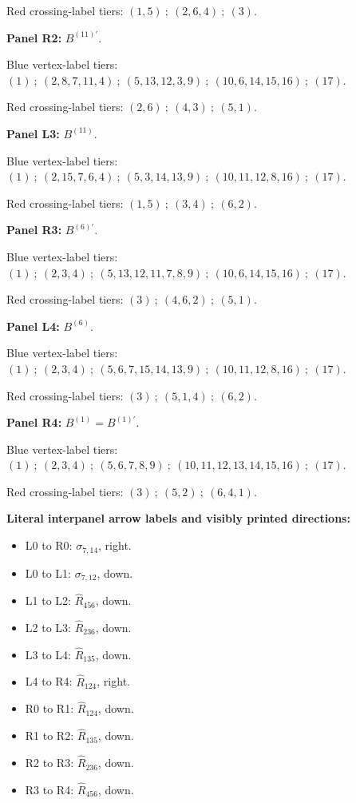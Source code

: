 \noindent Red crossing-label tiers: $(1,5)\ ;\ (2,6,4)\ ;\ (3)$.\par
\medskip\noindent\textbf{Panel R2:} $B^{(11)\prime}$.\par
\noindent Blue vertex-label tiers: $(1)\ ;\ (2,8,7,11,4)\ ;\ (5,13,12,3,9)\ ;\ (10,6,14,15,16)\ ;\ (17)$.\par
\noindent Red crossing-label tiers: $(2,6)\ ;\ (4,3)\ ;\ (5,1)$.\par
\medskip\noindent\textbf{Panel L3:} $B^{(11)}$.\par
\noindent Blue vertex-label tiers: $(1)\ ;\ (2,15,7,6,4)\ ;\ (5,3,14,13,9)\ ;\ (10,11,12,8,16)\ ;\ (17)$.\par
\noindent Red crossing-label tiers: $(1,5)\ ;\ (3,4)\ ;\ (6,2)$.\par
\medskip\noindent\textbf{Panel R3:} $B^{(6)\prime}$.\par
\noindent Blue vertex-label tiers: $(1)\ ;\ (2,3,4)\ ;\ (5,13,12,11,7,8,9)\ ;\ (10,6,14,15,16)\ ;\ (17)$.\par
\noindent Red crossing-label tiers: $(3)\ ;\ (4,6,2)\ ;\ (5,1)$.\par
\medskip\noindent\textbf{Panel L4:} $B^{(6)}$.\par
\noindent Blue vertex-label tiers: $(1)\ ;\ (2,3,4)\ ;\ (5,6,7,15,14,13,9)\ ;\ (10,11,12,8,16)\ ;\ (17)$.\par
\noindent Red crossing-label tiers: $(3)\ ;\ (5,1,4)\ ;\ (6,2)$.\par
\medskip\noindent\textbf{Panel R4:} $B^{(1)}=B^{(1)\prime}$.\par
\noindent Blue vertex-label tiers: $(1)\ ;\ (2,3,4)\ ;\ (5,6,7,8,9)\ ;\ (10,11,12,13,14,15,16)\ ;\ (17)$.\par
\noindent Red crossing-label tiers: $(3)\ ;\ (5,2)\ ;\ (6,4,1)$.\par
\medskip\noindent\textbf{Literal interpanel arrow labels and visibly printed directions:}\par
\begin{itemize}\itemsep=0pt
\item L0 to R0: $\sigma_{7,14}$, right.
\item L0 to L1: $\sigma_{7,12}$, down.
\item L1 to L2: $\widehat{R}_{456}$, down.
\item L2 to L3: $\widehat{R}_{236}$, down.
\item L3 to L4: $\widehat{R}_{135}$, down.
\item L4 to R4: $\widehat{R}_{124}$, right.
\item R0 to R1: $\widehat{R}_{124}$, down.
\item R1 to R2: $\widehat{R}_{135}$, down.
\item R2 to R3: $\widehat{R}_{236}$, down.
\item R3 to R4: $\widehat{R}_{456}$, down.
\end{itemize}
